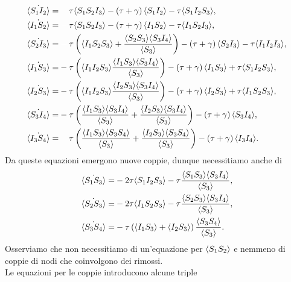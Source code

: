  \begin{equation*}
 \begin{aligned}
 \dot{\angol{S_1I_2}} =&\spa \tau\angol{S_1S_2I_3} - \tonde{ \tau + \gamma} \angol{S_1 I_2} -\tau\angol{S_1I_2S_3},\\
 \dot{\angol{I_1S_2}} =&\spa\tau\angol{S_1S_2I_3} - \tonde{ \tau + \gamma} \angol{I_1 S_2} -\tau\angol{I_1S_2I_3},\\
 \dot{\angol{S_2I_3}} =&\spa \tau\tonde{\angol{I_1S_2S_3} +\frac{\angol{S_2S_3}\angol{S_3I_4}}{\angol{S_3}}} - \tonde{ \tau + \gamma} \angol{S_2 I_3} -\tau\angol{I_1I_2I_3},\\
 \dot{\angol{I_1S_3}} =&- \tau\tonde{\angol{I_1I_2S_3} \frac{\angol{I_1S_3}\angol{S_3I_4}}{\angol{S_3}}} - \tonde{ \tau + \gamma} \angol{I_1 S_3} +\tau\angol{S_1I_2S_3},\\ 
  \dot{\angol{I_2S_3}} =&- \tau\tonde{\angol{I_1I_2S_3} \frac{\angol{I_2S_3}\angol{S_3I_4}}{\angol{S_3}}} - \tonde{ \tau + \gamma} \angol{I_2 S_3} +\tau\angol{I_1S_2S_3},\\ 
   \dot{\angol{S_3I_4}} =&- \tau\tonde{\frac{\angol{I_1S_3}\angol{S_3I_4}}{\angol{S_3}}+\frac{\angol{I_2S_3}\angol{S_3I_4}}{\angol{S_3}}} - \tonde{ \tau + \gamma} \angol{S_3 I_4}, \\ 
    \dot{\angol{I_3S_4}} =& \spa \tau\tonde{\frac{\angol{I_1S_3}\angol{S_3S_4}}{\angol{S_3}}+\frac{\angol{I_2S_3}\angol{S_3S_4}}{\angol{S_3}}} - \tonde{ \tau + \gamma} \angol{I_3 I_4}.\\ 
\end{aligned}
 \end{equation*}
 Da queste equazioni emergono nuove coppie, dunque necessitiamo anche di 
 \begin{equation*}
 \begin{aligned}
 \dot{\langle S_1S_3 \rangle}=& -2\tau \langle S_1I_2S_3 \rangle-\tau\frac{\langle S_1S_3 \rangle\langle S_3I_4 \rangle}{\langle S_3 \rangle},\\
 \dot{\langle S_2S_3 \rangle}=& -2\tau \langle I_1S_2S_3 \rangle-\tau\frac{\langle S_2S_3 \rangle\langle S_3I_4 \rangle}{\langle S_3 \rangle},\\
 \dot{\langle S_3S_4 \rangle}=& -\tau \left( \langle I_1S_3 \rangle+ \langle I_2S_3 \rangle \right)\frac{\langle S_3S_4 \rangle}{\langle S_3 \rangle}.
 \end{aligned}
 \end{equation*}
 Osserviamo che non necessitiamo di un'equazione per $\langle S_1S_2 \rangle$ e nemmeno di coppie di nodi che coinvolgono dei rimossi.\\
 Le equazioni per le coppie introducono alcune triple
